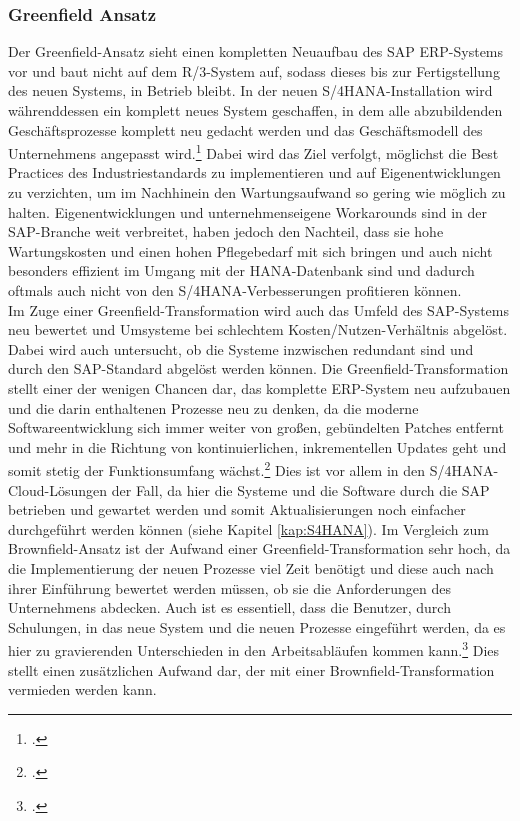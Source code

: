 \subsubsection{Greenfield Ansatz}
Der Greenfield-Ansatz sieht einen kompletten Neuaufbau des SAP ERP-Systems vor und baut nicht auf dem R/3-System auf, sodass dieses bis zur Fertigstellung des neuen Systems, in Betrieb bleibt. In der neuen S/4HANA-Installation wird währenddessen ein komplett neues System geschaffen, in dem alle abzubildenden Geschäftsprozesse komplett neu gedacht werden und das Geschäftsmodell des Unternehmens angepasst wird.\footcite[Vgl.][]{ao-blog} Dabei wird das Ziel verfolgt, möglichst die \glqq{}Best Practices\grqq{} des Industriestandards zu implementieren und auf Eigenentwicklungen zu verzichten, um im Nachhinein den Wartungsaufwand so gering wie möglich zu halten. Eigenentwicklungen und unternehmenseigene Workarounds sind in der SAP-Branche weit verbreitet, haben jedoch den Nachteil, dass sie hohe Wartungskosten und einen hohen Pflegebedarf mit sich bringen und auch nicht besonders effizient im Umgang mit der HANA-Datenbank sind und dadurch oftmals auch nicht von den S/4HANA-Verbesserungen profitieren können.\\Im Zuge einer Greenfield-Transformation wird auch das Umfeld des SAP-Systems neu bewertet und Umsysteme bei schlechtem Kosten/Nutzen-Verhältnis abgelöst. Dabei wird auch untersucht, ob die Systeme inzwischen redundant sind und durch den SAP-Standard abgelöst werden können. Die Greenfield-Transformation stellt einer der wenigen Chancen dar, das komplette ERP-System neu aufzubauen und die darin enthaltenen Prozesse neu zu denken, da die moderne Softwareentwicklung sich immer weiter von großen, gebündelten Patches entfernt und mehr in die Richtung von kontinuierlichen, inkrementellen Updates geht und somit stetig der Funktionsumfang wächst.\footcite[Vgl.][]{gambit-transformation} Dies ist vor allem in den S/4HANA-Cloud-Lösungen der Fall, da hier die Systeme und die Software durch die SAP betrieben und gewartet werden und somit Aktualisierungen noch einfacher durchgeführt werden können (siehe Kapitel \ref{kap:S4HANA}). Im Vergleich zum Brownfield-Ansatz ist der Aufwand einer Greenfield-Transformation sehr hoch, da die Implementierung der neuen Prozesse viel Zeit benötigt und diese auch nach ihrer Einführung bewertet werden müssen, ob sie die Anforderungen des Unternehmens abdecken. Auch ist es essentiell, dass die Benutzer, durch Schulungen, in das neue System und die neuen Prozesse eingeführt werden, da es hier zu gravierenden Unterschieden in den Arbeitsabläufen kommen kann.\footcite[Vgl.][]{gambit-transformation} Dies stellt einen zusätzlichen Aufwand dar, der mit einer Brownfield-Transformation vermieden werden kann.

